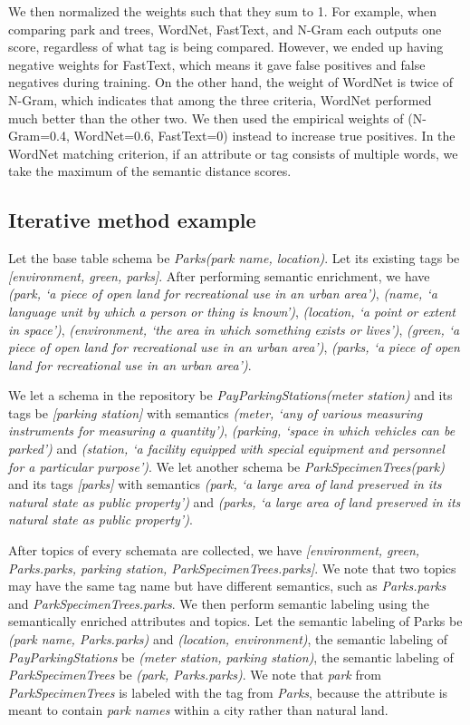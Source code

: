 We then normalized the weights such that they sum to 1. For example, when comparing park and trees, WordNet, FastText, and N-Gram each outputs one score, regardless of what tag is being compared. However, we ended up having negative weights for FastText, which means it gave false positives and false negatives during training. On the other hand, the weight of WordNet is twice of N-Gram, which indicates that among the three criteria, WordNet performed much better than the other two. We then used the empirical weights of (N-Gram=0.4, WordNet=0.6, FastText=0) instead to increase true positives. In the WordNet matching criterion, if an attribute or tag consists of multiple words, we take the maximum of the semantic distance scores.

\subsection{Iterative method example}
\label{ssec:IterativeMethodExample2}

Let the base table schema be \textit{Parks(park name, location)}. Let its existing tags be \textit{[environment, green, parks]}. After performing semantic enrichment, we have \textit{(park, `a piece of open land for recreational use in an urban area')}, \textit{(name, `a language unit by which a person or thing is known')}, \textit{(location, `a point or extent in space')}, \textit{(environment, `the area in which something exists or lives')}, \textit{(green, `a piece of open land for recreational use in an urban area')}, \textit{(parks, `a piece of open land for recreational use in an urban area')}.

We let a schema in the repository be \textit{PayParkingStations(meter station)} and its tags be \textit{[parking station]} with semantics \textit{(meter, `any of various measuring instruments for measuring a quantity')}, \textit{(parking, `space in which vehicles can be parked')} and \textit{(station, `a facility equipped with special equipment and personnel for a particular purpose')}. We let another schema be \textit{ParkSpecimenTrees(park)} and its tags \textit{[parks]} with semantics \textit{(park, `a large area of land preserved in its natural state as public property')} and \textit{(parks, `a large area of land preserved in its natural state as public property')}.

After topics of every schemata are collected, we have \textit{[environment, green, Parks.parks, parking station, ParkSpecimenTrees.parks]}. We note that two topics may have the same tag name but have different semantics, such as \textit{Parks.parks} and \textit{ParkSpecimenTrees.parks}. We then perform semantic labeling using the semantically enriched attributes and topics. Let the semantic labeling of Parks be \textit{(park name, Parks.parks)} and \textit{(location, environment)}, the semantic labeling of \textit{PayParkingStations} be \textit{(meter station, parking station)}, the semantic labeling of \textit{ParkSpecimenTrees} be \textit{(park, Parks.parks)}. We note that \textit{park} from \textit{ParkSpecimenTrees} is labeled with the tag from \textit{Parks}, because the attribute is meant to contain \textit{park names} within a city rather than natural land.

